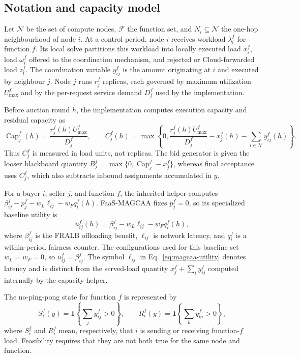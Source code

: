 \subsection{Notation and capacity model}
\label{sec:magcaa-notation}

Let $\mathcal N$ be the set of compute nodes, $\mathcal F$ the function set,
and $N_i\subseteq\mathcal N$ the one-hop neighbourhood of node $i$. At a
control period, node $i$ receives workload $\lambda_i^f$ for function $f$.
Its local solve partitions this workload into locally executed load $x_i^f$,
load $\omega_i^f$ offered to the coordination mechanism, and rejected or
Cloud-forwarded load $z_i^f$. The coordination variable $y_{ij}^f$ is the
amount originating at $i$ and executed by neighbour $j$. Node $j$ runs
$r_j^f$ replicas, each governed by maximum utilization $U_{\max}^f$ and by
the per-request service demand $D_j^f$ used by the implementation.

Before auction round $h$, the implementation computes execution capacity
and residual capacity as
\begin{equation}
  \operatorname{Cap}_j^f(h)=
    \frac{r_j^f(h)U_{\max}^f}{D_j^f},
  \qquad
  C_j^f(h)=\max\!\left\{0,
    \frac{r_j^f(h)U_{\max}^f}{D_j^f}
    -x_j^f(h)-\sum_{i\in\mathcal N}y_{ij}^f(h)
  \right\}.
  \label{eq:magcaa-residual-capacity}
\end{equation}
Thus $C_j^f$ is measured in load units, not replicas. The bid generator is
given the looser blackboard quantity
$B_j^f=\max\{0,\operatorname{Cap}_j^f-x_j^f\}$, whereas final acceptance
uses $C_j^f$, which also subtracts inbound assignments accumulated in $y$.

For a buyer $i$, seller $j$, and function $f$, the inherited helper computes
$\beta_{ij}^f-p_j^f-w_L\ell_{ij}-w_Fq_i^f(h)$. FaaS-MAGCAA fixes
$p_j^f=0$, so its specialized baseline utility is
\begin{equation}
  u_{ij}^f(h)=\beta_{ij}^f-w_L\ell_{ij}-w_Fq_i^f(h),
  \label{eq:magcaa-utility}
\end{equation}
where $\beta_{ij}^f$ is the FRALB offloading benefit, $\ell_{ij}$ is network
latency, and $q_i^f$ is a within-period fairness counter. The configurations
used for this baseline set $w_L=w_F=0$, so
$u_{ij}^f=\beta_{ij}^f$. The symbol $\ell_{ij}$ in
Eq.~\eqref{eq:magcaa-utility} denotes latency and is distinct from the
served-load quantity $x_j^f+\sum_i y_{ij}^f$ computed internally by the
capacity helper.

The no-ping-pong state for function $f$ is represented by
\begin{equation}
  S_i^f(y)=\mathbf 1\!\left\{\sum_j y_{ij}^f>0\right\},
  \qquad
  R_i^f(y)=\mathbf 1\!\left\{\sum_k y_{ki}^f>0\right\},
  \label{eq:magcaa-send-receive}
\end{equation}
where $S_i^f$ and $R_i^f$ mean, respectively, that $i$ is sending or
receiving function-$f$ load. Feasibility requires that they are not both
true for the same node and function.

